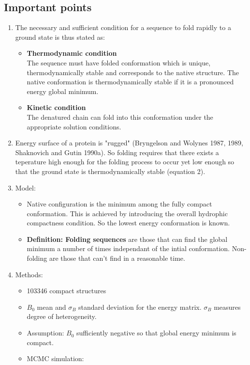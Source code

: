 \documentclass[12pt]{article}
\theoremstyle{definition}
\theoremstyle{remark}
\begin{document}
\subsection{Important points}
\begin{enumerate}
\item The necessary and sufficient condition for a sequence to fold rapidly to a ground state is thus stated as:
\begin{itemize}
\item \textbf{Thermodynamic condition}\\
The sequence must have folded conformation which is unique, thermodynamically stable and corresponds to the native structure. The native conformation is thermodynamically stable if it is a pronounced energy global minimum.
\item \textbf{Kinetic condition}\\
The denatured chain can fold into this conformation under the appropriate solution conditions.
\end{itemize}
\item Energy surface of a protein is "rugged" (Bryngelson and Wolynes 1987, 1989, Shaknovich and Gutin 1990a). So folding requires that there exists a teperature high enough for the folding process to occur yet low enough so that the ground state is thermodynamically stable (equation 2).
\item Model:
 \begin{itemize}
\item Native configuration is the minimum among the fully compact conformation. This is achieved by introducing the overall hydrophic compactness condition. So the lowest energy conformation is known.
\item \textbf{Definition: Folding sequences} are those that can find the global minimum a number of times independant of the intial conformation. Non-folding are those that can't find in a reasonable time.
\end{itemize}
\item Methods:
\begin{itemize}
\item 103346 compact structures
\item $B_0$ mean and $\sigma_B$ standard deviation for the energy matrix. $\sigma_B$ measures degree of heterogeneity.
\item Assumption: $B_0$ sufficiently negative so that global energy minimum is compact.
\item MCMC simulation:
\begin{itemize}

\end{itemize}
\end{itemize}
\end{enumerate}
\end{document}
